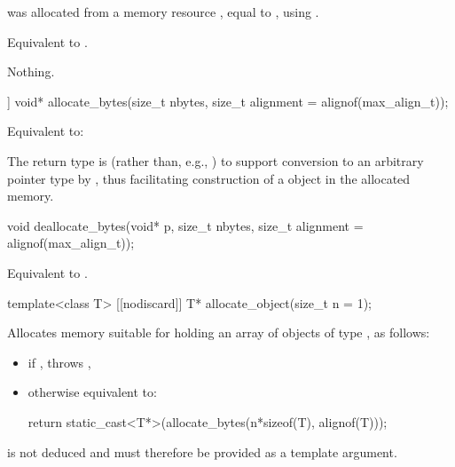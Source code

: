\begin{itemdescr}
\pnum
\expects
{} was allocated from a memory resource ,
equal to ,
using .

\pnum
\effects
Equivalent to .

\pnum
\throws
Nothing.
\end{itemdescr}

%
\begin{itemdecl}
[[nodiscard]] void* allocate_bytes(size_t nbytes, size_t alignment = alignof(max_align_t));
\end{itemdecl}

\begin{itemdescr}
\pnum
\effects
Equivalent to: 

\pnum
\begin{note}
The return type is  (rather than, e.g., )
to support conversion to an arbitrary pointer type 
by , thus facilitating construction of a 
object in the allocated memory.
\end{note}
\end{itemdescr}

%
\begin{itemdecl}
void deallocate_bytes(void* p, size_t nbytes, size_t alignment = alignof(max_align_t));
\end{itemdecl}

\begin{itemdescr}
\pnum
\effects
Equivalent to .
\end{itemdescr}

%
\begin{itemdecl}
template<class T>
  [[nodiscard]] T* allocate_object(size_t n = 1);
\end{itemdecl}

\begin{itemdescr}
\pnum
\effects
Allocates memory suitable for holding
an array of  objects of type , as follows:
\begin{itemize}
\item
  if ,
  throws ,
\item
  otherwise equivalent to:
\begin{codeblock}
return static_cast<T*>(allocate_bytes(n*sizeof(T), alignof(T)));
\end{codeblock}
\end{itemize}

\pnum
\begin{note}
 is not deduced and must therefore be provided as a template argument.
\end{note}
\end{itemdescr}

